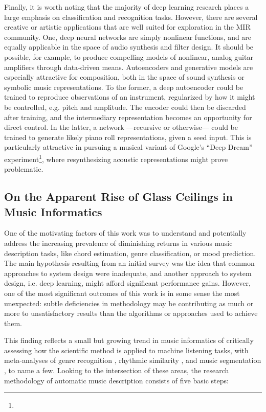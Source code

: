 Finally, it is worth noting that the majority of deep learning research places a large emphasis on classification and recognition tasks.
However, there are several creative or artistic applications that are well suited for exploration in the MIR community.
One, deep neural networks are simply nonlinear functions, and are equally applicable in the space of audio synthesis and filter design.
It should be possible, for example, to produce compelling models of nonlinear, analog guitar amplifiers through data-driven means.
Autoencoders and generative models are especially attractive for composition, both in the space of sound synthesis or symbolic music representations.
To the former, a deep autoencoder could be trained to reproduce observations of an instrument, regularized by how it might be controlled, e.g. pitch and amplitude.
The encoder could then be discarded after training, and the intermediary representation becomes an opportunity for direct control.
In the latter, a network ---recursive or otherwise--- could be trained to generate likely piano roll representations, given a seed input.
This is particularly attractive in pursuing a musical variant of Google's ``Deep Dream'' experiment\footnote{}, where resynthesizing acoustic representations might prove problematic.


\subsection{On the Apparent Rise of Glass Ceilings in Music Informatics}

One of the motivating factors of this work was to understand and potentially address the increasing prevalence of diminishing returns in various music description tasks, like chord estimation, genre classification, or mood prediction.
The main hypothesis resulting from an initial survey was the idea that common approaches to system design were inadequate, and another approach to system design, i.e. deep learning, might afford significant performance gains.
However, one of the most significant outcomes of this work is in some sense the most unexpected:
subtle deficiencies in methodology may be contributing as much or more to unsatisfactory results than the algorithms or approaches used to achieve them.

This finding reflects a small but growing trend in music informatics of critically assessing how the scientific method is applied to machine listening tasks, with meta-analyses of genre recognition \cite{Sturm2014Simple}, rhythmic similarity \cite{Esparza2014Genre}, and music segmentation \cite{Nieto2015Segmentation}, to name a few.
Looking to the intersection of these areas, the research methodology of automatic music description consists of five basic steps:

